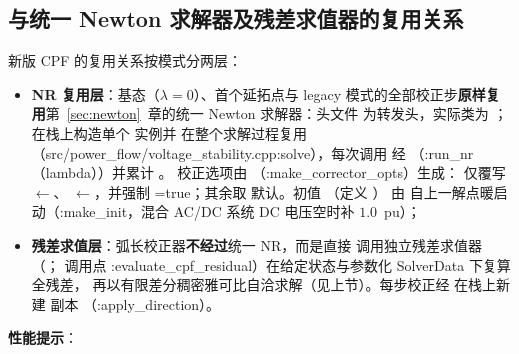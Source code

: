 \subsection{与统一 Newton 求解器及残差求值器的复用关系}
新版 CPF 的复用关系按模式分两层：
\begin{itemize}
  \item \textbf{NR 复用层}：基态（$\lambda=0$）、首个延拓点与 legacy
        模式的全部校正步\textbf{原样复用}第~\ref{sec:newton}~章的统一
        Newton 求解器：头文件 
        为转发头，实际类为 ；
         在栈上构造单个  实例并
        在整个求解过程复用（src/power\_flow/voltage\_stability.cpp:solve），每次调用
        经 （:run\_nr（lambda））并累计 。
        校正选项由 （:make\_corrector\_opts）生成：
        仅覆写 $\leftarrow$、
        $\leftarrow$，并强制
        =true；其余取
         默认。初值
        （定义
        ）
        由  自上一解点暖启动（:make\_init，混合 AC/DC
        系统 DC 电压空时补 $1.0$~pu）；
  \item \textbf{残差求值层}：弧长校正器\textbf{不经过}统一 NR，而是直接
        调用独立残差求值器 
        （；
        调用点 :evaluate\_cpf\_residual）在给定状态与参数化 SolverData 下复算全残差，
        再以有限差分稠密雅可比自洽求解（见上节）。每步校正经
         在栈上新建  副本
        （:apply\_direction）。
\end{itemize}
\textbf{性能提示}：
